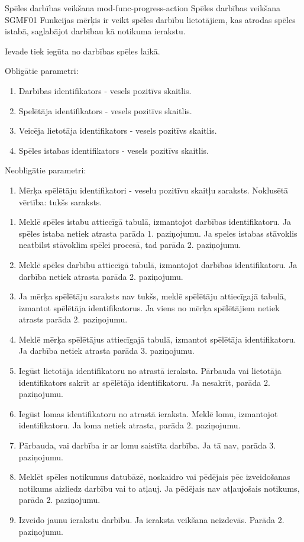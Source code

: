 \moduleFunctionTable
{Spēles darbības veikšana}
{mod-func-progress-action}
{Spēles darbības veikšana}
{SGMF01}
{
	Funkcijas mērķis ir veikt spēles darbību lietotājiem, kas atrodas spēles istabā, saglabājot darbībau kā notikuma ierakstu.
}
{
	Ievade tiek iegūta no darbības spēles laikā.

	Obligātie parametri:
	\begin{enumerate}
		\item Darbības identifikators - vesels pozitīvs skaitlis.
		\item Spelētāja identifikators - vesels pozitīvs skaitlis.
		\item Veicēja lietotāja identifikators - vesels pozitīvs skaitlis.
		\item Spēles istabas identifikators - vesels pozitīvs skaitlis.
	\end{enumerate}

	Neobligātie parametri:
	\begin{enumerate}
		\item Mērķa spēlētāju identifikatori - veselu pozitīvu skaitļu saraksts.
		      Noklusētā vērtība: tukšs saraksts.
	\end{enumerate}
}
{
	\begin{enumerate}
		\item Meklē spēles istabu attiecīgā tabulā, izmantojot darbības identifikatoru.
		      Ja spēles istaba netiek atrasta parāda 1. paziņojumu.
		      Ja speles istabas stāvoklis neatbilst stāvoklim spēlei procesā, tad parāda 2. paziņojumu.
		\item Meklē spēles darbību attiecīgā tabulā, izmantojot darbības identifikatoru.
		      Ja darbība netiek atrasta parāda 2. paziņojumu.
		\item Ja mērķa spēlētāju saraksts nav tukšs, meklē spēlētāju attiecīgajā tabulā, izmantot spēlētāja identifikatorus.
		      Ja viens no mērķa spēlētājiem netiek atrasts parāda 2. paziņojumu.
		\item Meklē mērķa spēlētājus attiecīgajā tabulā, izmantot spēlētāja identifikatoru.
		      Ja darbība netiek atrasta parāda 3. paziņojumu.
		\item Iegūst lietotāja identifikatoru no atrastā ieraksta.
		      Pārbauda vai lietotāja identifikators sakrīt ar spēlētāja identifikatoru.
		      Ja nesakrīt, parāda 2. paziņojumu.
		\item Iegūst lomas identifikatoru no atrastā ieraksta.
		      Meklē lomu, izmantojot identifikatoru.
		      Ja loma netiek atrasta, parāda 2. paziņojumu.
		\item Pārbauda, vai darbība ir ar lomu saistīta darbība.
		      Ja tā nav, parāda 3. paziņojumu.
		\item Meklēt spēles notikumus datubāzē, noskaidro vai pēdējais pēc izveidošanas notikums aizliedz darbību vai to atļauj.
		      Ja pēdējais nav atļaujošais notikums, parāda 2. paziņojumu.
		\item Izveido jaunu ierakstu darbību.
		      Ja ieraksta veikšana neizdevās.
		      Parāda 2. paziņojumu.
	\end{enumerate}
}
